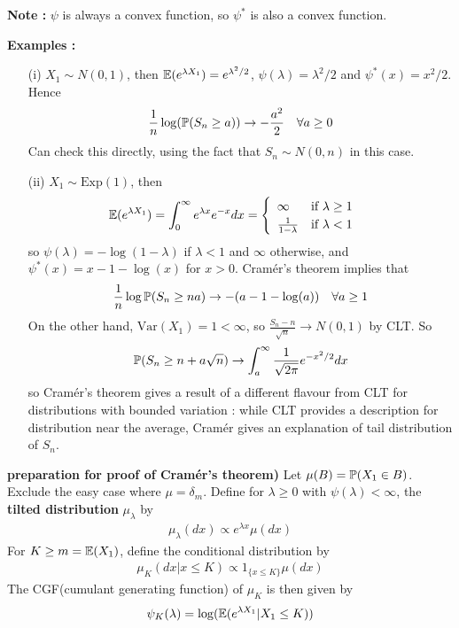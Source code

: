 \documentclass[12pt,a4paper]{report}
\newenvironment{proof}
{\begin{changemargin}{1cm}{0.5cm} 
	}%
	{\end{changemargin}
}
\begin{document}
\textbf{Note :} $\psi$ is always a convex function, so $\psi^*$ is also a convex function.
\s

\textbf{Examples :}
\begin{itemize}
\item[(i)] $X_1 \sim N(0,1)$, then $\mathbb{E}(e^{\lambda X_1}) = e^{\lambda^2 /2}$,  $\psi(\lambda) = \lambda^2 /2$ and $\psi^*(x) = x^2/2$. Hence
\begin{align*}
\frac{1}{n} \log (\mathbb{P}(S_n \geq a)) \rightarrow -\frac{a^2}{2} \quad \forall a\geq 0
\end{align*}
Can check this directly, using the fact that $S_n \sim N(0,n)$ in this case.
\item[(ii)] $X_1 \sim \text{Exp}(1)$, then
\begin{align*}
\mathbb{E}(e^{\lambda X_1}) = \int_0^{\infty} e^{\lambda x} e^{-x} dx = \begin{cases}
\begin{array}{ll}
\infty & \text{if } \lambda \geq 1 \\
\frac{1}{1-\lambda} & \text{if } \lambda <1
\end{array}
\end{cases}
\end{align*} 
so $\psi(\lambda) = -\log (1-\lambda)$ if $\lambda <1$ and $\infty$ otherwise, and $\psi^*(x) = x-1-\log(x)$ for $x>0$. Cram\'{e}r's theorem implies that
\begin{align*}
\frac{1}{n} \log \mathbb{P}(S_n \geq na) \rightarrow -(a-1-\log (a)) \quad \forall a\geq 1
\end{align*}
On the other hand, $\text{Var}(X_1) =1 <\infty$, so $\frac{S_n -n}{\sqrt{n}} \rightarrow N(0,1)$ by CLT. So
\begin{align*}
\mathbb{P}(S_n \geq n + a\sqrt{n}) \rightarrow \int_a^{\infty} \frac{1}{\sqrt{2\pi}} e^{-x^2/2} dx
\end{align*}
so Cram\'{e}r's theorem gives a result of a different flavour from CLT for distributions with bounded variation : while CLT provides a description for distribution near the average, Cram\'{e}r gives an explanation of tail distribution of $S_n$.
\end{itemize}
\s

\begin{proof}
\textbf{preparation for proof of Cram\'{e}r's theorem) } Let $\mu(B) = \mathbb{P}(X_1 \in B)$. Exclude the easy case where $\mu = \delta_m$. Define for $\lambda \geq 0$ with $\psi(\lambda) < \infty$, the \textbf{tilted distribution} $\mu_{\lambda}$ by
\begin{align*}
\mu_{\lambda} (dx) \propto e^{\lambda x} \mu(dx)
\end{align*}
For $K \geq m = \mathbb{E}(X_1)$, define the conditional distribution by
\begin{align*}
\mu_K(dx | x\leq K) \propto 1_{\{x\leq K\}} \mu(dx)
\end{align*}
The CGF(cumulant generating function) of $\mu_K$ is then given by
\begin{align*}
\psi_{K}(\lambda) = \log(\mathbb{E}(e^{\lambda X_1} | X_1 \leq K))
\end{align*}
\end{proof}
\end{document}
